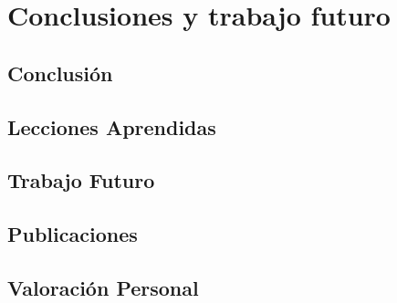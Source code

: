 \chapter{Conclusiones y trabajo futuro}
\label{cap:ConclusionPropuesta}

\section{Conclusión}
\label{sec:Conclusion}

\section{Lecciones Aprendidas}
\label{sec:LeccionesAprendidas}

\section{Trabajo Futuro}
\label{sec:TrabajoFuturo}

\section{Publicaciones}
\label{sec:Publicaciones}

\section{Valoración Personal}
\label{sec:Valoracion}